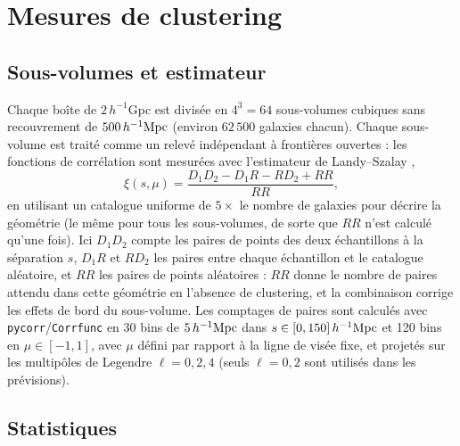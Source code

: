 \section{Mesures de clustering}
\label{sec:clustering}

\subsection{Sous-volumes et estimateur}

Chaque boîte de $2\,h^{-1}$Gpc est divisée en $4^3=64$ sous-volumes cubiques sans recouvrement de $500\,h^{-1}\mathrm{Mpc}$ (environ $62\,500$ galaxies chacun). Chaque sous-volume est traité comme un relevé indépendant à frontières ouvertes : les fonctions de corrélation sont mesurées avec l'estimateur de Landy--Szalay \cite{LandySzalay1993},
\begin{equation}
\xi(s,\mu) = \frac{D_1D_2 - D_1R - RD_2 + RR}{RR},
\end{equation}
en utilisant un catalogue uniforme de $5\times$ le nombre de galaxies pour décrire la géométrie (le même pour tous les sous-volumes, de sorte que $RR$ n'est calculé qu'une fois). Ici $D_1D_2$ compte les paires de points des deux échantillons à la séparation $s$, $D_1R$ et $RD_2$ les paires entre chaque échantillon et le catalogue aléatoire, et $RR$ les paires de points aléatoires : $RR$ donne le nombre de paires attendu dans cette géométrie en l'absence de clustering, et la combinaison corrige les effets de bord du sous-volume. Les comptages de paires sont calculés avec \texttt{pycorr}/\texttt{Corrfunc} \cite{Sinha2020} en 30 bins de $5\,h^{-1}\mathrm{Mpc}$ dans $s\in[0,150]\,h^{-1}\mathrm{Mpc}$ et 120 bins en $\mu\in[-1,1]$, avec $\mu$ défini par rapport à la ligne de visée fixe, et projetés sur les multipôles de Legendre $\ell=0,2,4$ (seuls $\ell=0,2$ sont utilisés dans les prévisions).

\subsection{Statistiques}

